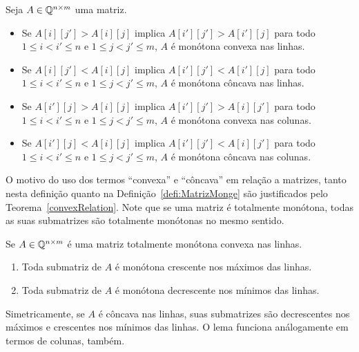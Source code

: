 \begin{defi}
Seja $A \in \mathbb{Q}^{n \times m}$ uma matriz.
    \begin{itemize}
        \item Se $A[i][j'] > A[i][j]$ implica $A[i'][j'] > A[i'][j]$ para todo $1 \leq i < i' \leq n$ e $1 \leq j < j' \leq m$, $A$ é monótona convexa nas linhas.
        \item Se $A[i][j'] < A[i][j]$ implica $A[i'][j'] < A[i'][j]$ para todo $1 \leq i < i' \leq n$ e $1 \leq j < j' \leq m$, $A$ é monótona côncava nas linhas.
        \item Se $A[i'][j] > A[i][j]$ implica $A[i'][j'] > A[i][j']$ para todo $1 \leq i < i' \leq n$ e $1 \leq j < j' \leq m$, $A$ é monótona convexa nas colunas.
        \item Se $A[i'][j] < A[i][j]$ implica $A[i'][j'] < A[i][j']$ para todo $1 \leq i < i' \leq n$ e $1 \leq j < j' \leq m$, $A$ é monótona côncava nas colunas.
    \end{itemize}
\end{defi}

O motivo do uso dos termos ``convexa'' e ``côncava'' em relação a matrizes, tanto nesta definição quanto na Definição~\ref{defi:MatrizMonge} são justificados pelo Teorema~\ref{convexRelation}. Note que se uma matriz é totalmente monótona, todas as suas submatrizes são totalmente monótonas no mesmo sentido.

\begin{lema}
Se $A \in \mathbb{Q}^{n \times m}$ é uma matriz totalmente monótona convexa nas linhas.
    \begin{enumerate}
        \item Toda submatriz de $A$ é monótona crescente nos máximos das linhas.
        \item Toda submatriz de $A$ é monótona decrescente nos mínimos das linhas.
    \end{enumerate}

Simetricamente, se $A$ é côncava nas linhas, suas submatrizes são decrescentes nos máximos e crescentes nos mínimos das linhas. O lema funciona análogamente em termos de colunas, também.  
\end{lema}

